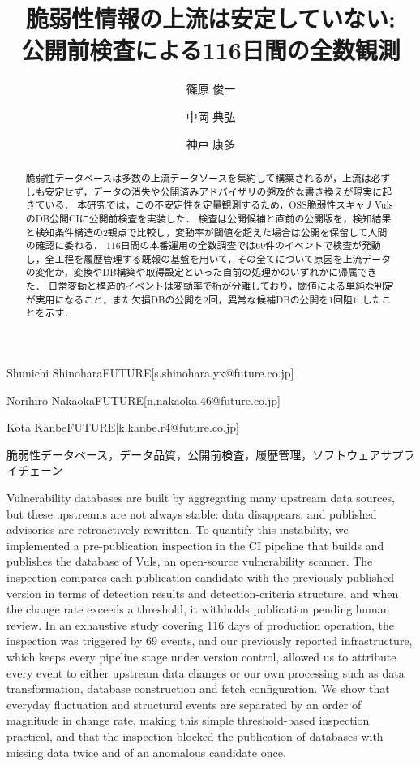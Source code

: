 \documentclass{css}
\begin{document}

\title{脆弱性情報の上流は安定していない: \\ 公開前検査による116日間の全数観測}


\author{篠原 俊一}{Shunichi Shinohara}{FUTURE}[s.shinohara.yx@future.co.jp]
\author{中岡 典弘}{Norihiro Nakaoka}{FUTURE}[n.nakaoka.46@future.co.jp]
\author{神戸 康多}{Kota Kanbe}{FUTURE}[k.kanbe.r4@future.co.jp]

\begin{abstract}
脆弱性データベースは多数の上流データソースを集約して構築されるが，上流は必ずしも安定せず，データの消失や公開済みアドバイザリの遡及的な書き換えが現実に起きている．
本研究では，この不安定性を定量観測するため，OSS脆弱性スキャナVulsのDB公開CIに公開前検査を実装した．
検査は公開候補と直前の公開版を，検知結果と検知条件構造の2観点で比較し，変動率が閾値を超えた場合は公開を保留して人間の確認に委ねる．
116日間の本番運用の全数調査では69件のイベントで検査が発動し，全工程を履歴管理する既報の基盤を用いて，その全てについて原因を上流データの変化か，変換やDB構築や取得設定といった自前の処理かのいずれかに帰属できた．
日常変動と構造的イベントは変動率で桁が分離しており，閾値による単純な判定が実用になること，また欠損DBの公開を2回，異常な候補DBの公開を1回阻止したことを示す．
\end{abstract}

\begin{jkeyword}
脆弱性データベース，データ品質，公開前検査，履歴管理，ソフトウェアサプライチェーン
\end{jkeyword}

\begin{eabstract}
Vulnerability databases are built by aggregating many upstream data sources, but these upstreams are not always stable: data disappears, and published advisories are retroactively rewritten.
To quantify this instability, we implemented a pre-publication inspection in the CI pipeline that builds and publishes the database of Vuls, an open-source vulnerability scanner.
The inspection compares each publication candidate with the previously published version in terms of detection results and detection-criteria structure, and when the change rate exceeds a threshold, it withholds publication pending human review.
In an exhaustive study covering 116 days of production operation, the inspection was triggered by 69 events, and our previously reported infrastructure, which keeps every pipeline stage under version control, allowed us to attribute every event to either upstream data changes or our own processing such as data transformation, database construction and fetch configuration.
We show that everyday fluctuation and structural events are separated by an order of magnitude in change rate, making this simple threshold-based inspection practical, and that the inspection blocked the publication of databases with missing data twice and of an anomalous candidate once.
\end{eabstract}
\end{document}
